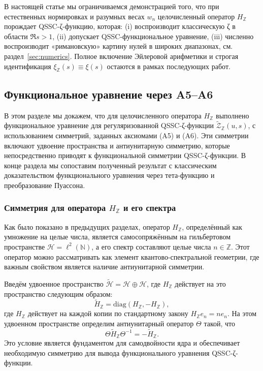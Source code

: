 \documentclass{article}
\numberwithin{equation}{section}
\theoremstyle{plain}
\theoremstyle{definition}
\theoremstyle{remark}
\begin{document}
\noindent
В настоящей статье мы ограничиваемся демонстрацией того, что при
естественных нормировках и разумных весах $w_n$ целочисленный оператор
$H_{\mathbb Z}$ порождает QSSC-ζ-функцию, которая:
(i) воспроизводит классическую ζ в области $\Re s>1$,
(ii) допускает QSSC-функциональное уравнение,
(iii) численно воспроизводит «римановскую» картину нулей в широких
диапазонах, см. раздел~\ref{sec:numerics}. Полное включение
Эйлеровой арифметики и строгая идентификация
$\xi_{\mathbb Z}(s)\equiv\xi(s)$ остаются в рамках последующих работ.


\subsection{Функциональное уравнение через A5–A6}
\label{subsec:functional-equation-A5A6}

\noindent
В этом разделе мы докажем, что для целочисленного оператора
$H_{\mathbb Z}$ выполнено функциональное уравнение для
регуляризованной QSSC-ζ-функции $\widetilde{\mathcal Z}_{\mathbb Z}(u,s)$,
с использованием симметрий, заданных аксиомами (A5) и (A6). Эти
симметрии включают удвоение пространства и антиунитарную симметрию,
которые непосредственно приводят к функциональной симметрии
QSSC-ζ-функции. В конце раздела мы сопоставим полученный результат
с классическим доказательством функционального уравнения через
тета-функцию и преобразование Пуассона.

\subsubsection{Симметрия для оператора \texorpdfstring{$H_{\mathbb Z}$}{H\_Z} и его спектра}
\label{subsubsec:symmetry-HZ}

\noindent
Как было показано в предыдущих разделах, оператор $H_{\mathbb Z}$,
определённый как умножение на целые числа, является самосопряжённым
на гильбертовом пространстве $\mathcal H = \ell^2(\mathbb N)$, а его спектр
составляют целые числа $n\in\mathbb Z$. Этот оператор можно
рассматривать как элемент квантово-спектральной геометрии, где
важным свойством является наличие антиунитарной симметрии.

Введём удвоенное пространство $\widetilde{\mathcal H} = \mathcal H \oplus \mathcal H$,
где $H_{\mathbb Z}$ действует на это пространство следующим образом:
\[
\widetilde{H}_{\mathbb Z} = \text{diag}(H_{\mathbb Z}, -H_{\mathbb Z}),
\]
где $H_{\mathbb Z}$ действует на каждой копии по стандартному закону
$H_{\mathbb Z} e_n = n e_n$. На этом удвоенном пространстве
определим антиунитарный оператор $\Theta$ такой, что
\[
\Theta \widetilde{H}_{\mathbb Z} \Theta^{-1} = -\widetilde{H}_{\mathbb Z}.
\]
Это условие является фундаментом для самодвойности ядра и обеспечивает
необходимую симметрию для вывода функционального уравнения
QSSC-ζ-функции.
\end{document}

